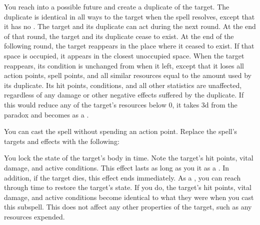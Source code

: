 \begin{spellcontent}
\begin{augmenttargetinginfo}
\end{augmenttargetinginfo}
\begin{augmenteffects}
\spelleffect
You reach into a possible future and create a duplicate of the target.
The duplicate is identical in all ways to the target when the spell resolves, except that it has no .
The target and its duplicate can act during the next round.
At the end of that round, the target and its duplicate cease to exist.
At the end of the following round, the target reappears in the place where it ceased to exist.
If that space is occupied, it appears in the closest unoccupied space.
When the target reappears, its condition is unchanged from when it left, except that it loses all action points, spell points, and all similar resources equal to the amount used by its duplicate.
Its hit points, conditions, and all other statistics are unaffected, regardless of any damage or other negative effects suffered by the duplicate.
If this would reduce any of the target's resources below 0, it takes  \plus3d from the paradox and becomes  as a .
\end{augmenteffects}
\end{spellcontent}
You can cast the spell without spending an action point.
Replace the spell's targets and effects with the following:
\begin{spellcontent}
\begin{augmenttargetinginfo}
\end{augmenttargetinginfo}
\begin{augmenteffects}
\spelleffect
You lock the state of the target's body in time.
Note the target's hit points, vital damage, and active conditions.
This effect lasts as long as you  it as a .
In addition, if the target dies, this effect ends immediately.
As a , you can reach through time to restore the target's state.
If you do, the target's hit points, vital damage, and active conditions become identical to what they were when you cast this subspell.
This does not affect any other properties of the target, such as any resources expended.
\end{augmenteffects}
\end{spellcontent}
